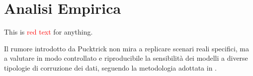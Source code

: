 \documentclass[../main.tex]{subfiles}
\begin{document}
\chapter{Analisi Empirica}
\label{chap:EmpyricAnalysis}

This is \textcolor{red}{red text} for anything.


Il rumore introdotto da Pucktrick non mira a replicare 
scenari reali specifici, ma a valutare in modo controllato 
e riproducibile la sensibilità dei modelli a diverse 
tipologie di corruzione dei dati, seguendo la metodologia 
adottata in \cite{maurino2025data}.
\end{document}
